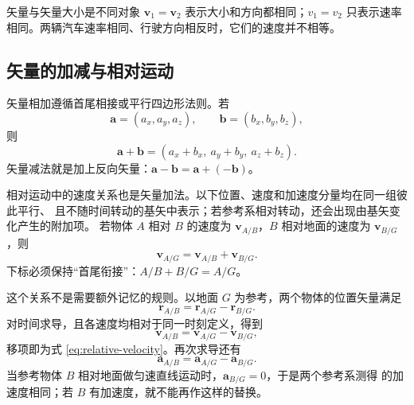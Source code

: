 \documentclass[UTF8,zihao=-4,oneside,openany]{ctexbook}
\numberwithin{equation}{section}
\newcommand{\vect}[1]{\bm{#1}}
\begin{document}
\begin{warningbox}{矢量与矢量大小是不同对象}
$\vect v_1=\vect v_2$ 表示大小和方向都相同；$v_1=v_2$ 只表示速率相同。两辆汽车速率相同、行驶方向相反时，它们的速度并不相等。
\end{warningbox}

\subsection{矢量的加减与相对运动}

矢量相加遵循首尾相接或平行四边形法则。若
\[
  \vect a=(a_x,a_y,a_z),\qquad \vect b=(b_x,b_y,b_z),
\]
则
\begin{equation}
  \vect a+\vect b=(a_x+b_x,\ a_y+b_y,\ a_z+b_z).
  \label{eq:vector-add}
\end{equation}
矢量减法就是加上反向矢量：$\vect a-\vect b=\vect a+(-\vect b)$。

\begin{center}
\end{center}

相对运动中的速度关系也是矢量加法。以下位置、速度和加速度分量均在同一组彼此平行、
且不随时间转动的基矢中表示；若参考系相对转动，还会出现由基矢变化产生的附加项。
若物体 $A$ 相对 $B$ 的速度为 $\vect v_{A/B}$，$B$ 相对地面的速度为 $\vect v_{B/G}$，则
\begin{equation}
  \vect v_{A/G}=\vect v_{A/B}+\vect v_{B/G}.
  \label{eq:relative-velocity}
\end{equation}
下标必须保持“首尾衔接”：$A/B+B/G=A/G$。

这个关系不是需要额外记忆的规则。以地面 $G$ 为参考，两个物体的位置矢量满足
\begin{equation}
  \vect r_{A/B}=\vect r_{A/G}-\vect r_{B/G}.
  \label{eq:relative-position}
\end{equation}
对时间求导，且各速度均相对于同一时刻定义，得到
\[
  \vect v_{A/B}=\vect v_{A/G}-\vect v_{B/G},
\]
移项即为式 \eqref{eq:relative-velocity}。再次求导还有
\begin{equation}
  \vect a_{A/B}=\vect a_{A/G}-\vect a_{B/G}.
  \label{eq:relative-acceleration}
\end{equation}
当参考物体 $B$ 相对地面做匀速直线运动时，$\vect a_{B/G}=0$，于是两个参考系测得
的加速度相同；若 $B$ 有加速度，就不能再作这样的替换。
\end{document}

